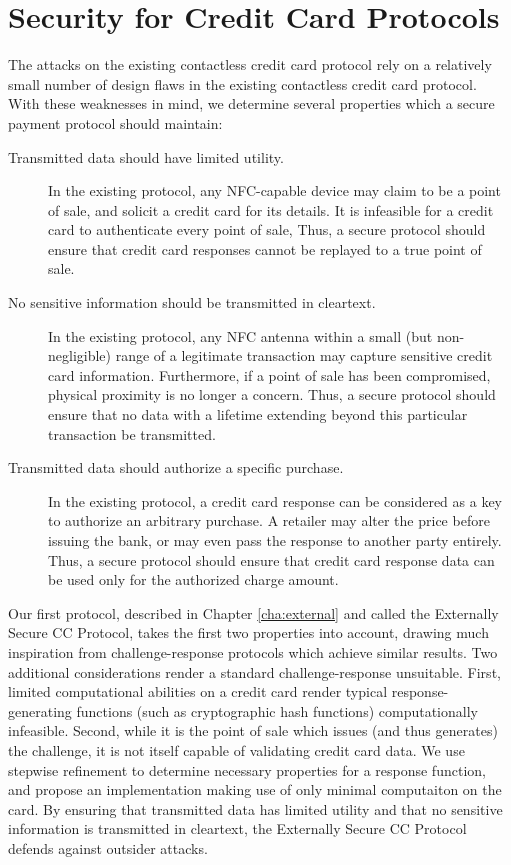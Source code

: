 \section{Security for Credit Card Protocols}
\label{sec:intro-approach-security}

The attacks on the existing contactless credit card protocol rely on a relatively small number of design flaws in the existing contactless credit card protocol.
With these weaknesses in mind, we determine several properties which a secure payment protocol should maintain:

\begin{description}
    \item[Transmitted data should have limited utility.]
        In the existing protocol, any NFC-capable device may claim to be a point of sale, and solicit a credit card for its details.
        It is infeasible for a credit card to authenticate every point of sale,
        Thus, a secure protocol should ensure that credit card responses cannot be replayed to a true point of sale.
    \item[No sensitive information should be transmitted in cleartext.]
        In the existing protocol, any NFC antenna within a small (but non-negligible) range of a legitimate transaction may capture sensitive credit card information.
        Furthermore, if a point of sale has been compromised, physical proximity is no longer a concern.
        Thus, a secure protocol should ensure that no data with a lifetime extending beyond this particular transaction be transmitted.
    \item[Transmitted data should authorize a specific purchase.]
        In the existing protocol, a credit card response can be considered as a key to authorize an arbitrary purchase.
        A retailer may alter the price before issuing the bank, or may even pass the response to another party entirely.
        Thus, a secure protocol should ensure that credit card response data can be used only for the authorized charge amount.
\end{description}

Our first protocol, described in Chapter \ref{cha:external} and called the Externally Secure CC Protocol, takes the first two properties into account,
    drawing much inspiration from challenge-response protocols which achieve similar results.
Two additional considerations render a standard challenge-response unsuitable.
First, limited computational abilities on a credit card render typical response-generating functions
    (such as cryptographic hash functions) computationally infeasible.
Second, while it is the point of sale which issues (and thus generates) the challenge, it is not itself capable of validating credit card data.
We use stepwise refinement to determine necessary properties for a response function, and propose an implementation making use of only minimal computaiton on the card.
By ensuring that transmitted data has limited utility and that no sensitive information is transmitted in cleartext,
    the Externally Secure CC Protocol defends against outsider attacks.

